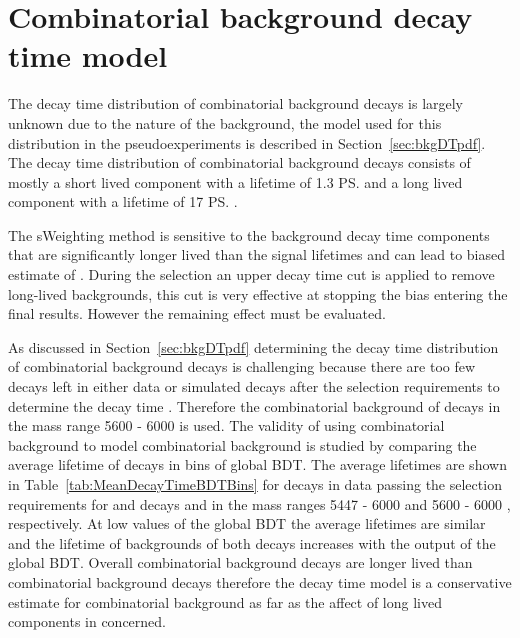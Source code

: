 \section{Combinatorial background decay time model}
\label{sec:CBGdecytimemodel}

The decay time distribution of combinatorial background decays is largely unknown due to the nature of the background, the model used for this distribution in the pseudoexperiments is described in Section~\ref{sec:bkgDTpdf}. The decay time distribution of combinatorial background decays consists of mostly a short lived component with a lifetime of 1.3 \ps and a long lived component with a lifetime of 17 \ps.

The sWeighting method is sensitive to the background decay time components that are significantly longer lived than the signal lifetimes and can lead to biased estimate of \tmumu. 
During the selection an upper decay time cut is applied to remove long-lived backgrounds, this cut is very effective at stopping the bias entering the final results. However the remaining effect must be evaluated.

As discussed in Section~\ref{sec:bkgDTpdf} determining the decay time distribution of combinatorial background decays is challenging because there are too few decays left in either data or \bbbarmumux simulated decays after the selection requirements to determine the decay time \pdf. Therefore the combinatorial background of \bhh decays in the mass range 5600 - 6000 \mevcc is used. The validity of using \bhh combinatorial background to model \bsmumu combinatorial background is studied by comparing the average lifetime of decays in bins of global BDT. The average lifetimes are shown in Table~\ref{tab:MeanDecayTimeBDTBins} for decays in data passing the selection requirements for \bsmumu and \bhh decays and in the mass ranges 5447 - 6000 \mevcc and 5600 - 6000 \mevcc, respectively. At low values of the global BDT the average lifetimes are similar and the lifetime of backgrounds of both decays increases with the output of the global BDT. Overall \bhh combinatorial background decays are longer lived than \bsmumu combinatorial background decays therefore the \bhh decay time model is a conservative estimate for \bsmumu combinatorial background as far as the affect of long lived components in concerned. 


